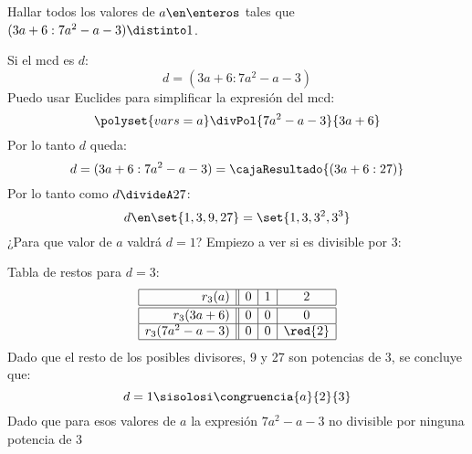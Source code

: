 \begin{enunciado}{\ejExtra}
	Hallar todos los valores de $a \en \enteros$ tales que $(3a+6 : 7a^2 - a -3) \distinto 1$.
\end{enunciado}
Si el mcd es $d$:
$$
	d = (3a+6 : 7a^2 - a -3)
$$
Puedo usar Euclides para simplificar la expresión del mcd:
$$
	\polyset{vars=a}
	\divPol{7a^2-a-3}{3a+6}
$$
Por lo tanto $d$ queda:
$$
	d = (3a+6 : 7a^2 - a -3) =
	\cajaResultado{(3a + 6 : 27)}
$$
Por lo tanto como $d \divideA 27$:
$$
    d \en \set{1,3,9,27} = \set{1,3,3^2, 3^3}
$$
¿Para que valor de $a$ valdrá  $d=1$? Empiezo a ver si es divisible por 3:

Tabla de restos para $d = 3$:
$$
	\begin{array}{|r||c|c|c|}
		\hline
		r_3(a)            & 0 & 1 & 2       \\ \hline\hline
		r_3(3a+6)         & 0 & 0 & 0       \\ \hline
		r_3(7a^2 - a - 3) & 0 & 0 & \red{2} \\ \hline
	\end{array}
$$
Dado que el resto de los posibles divisores, 9 y 27 son potencias de 3, se concluye que:
$$
	d = 1 \sisolosi \congruencia{a}{2}{3}
$$
Dado que para esos valores de $a$ la expresión $7a^2-a-3$ no divisible por ninguna potencia de 3

\begin{aportes}
	\item {}
\end{aportes}
